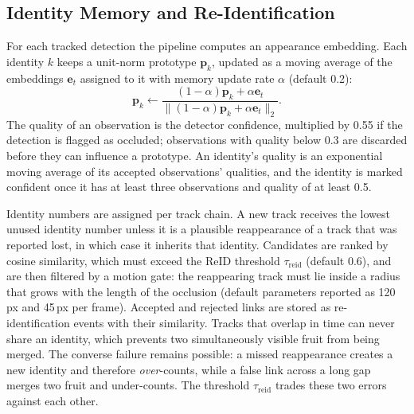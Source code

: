 \documentclass[11pt]{article}
\begin{document}
\subsection{Identity Memory and Re-Identification}

For each tracked detection the pipeline computes an appearance embedding. Each identity $k$ keeps a unit-norm prototype $\mathbf{p}_k$, updated as a moving average of the embeddings $\mathbf{e}_t$ assigned to it with memory update rate $\alpha$ (default 0.2):
\begin{equation}
\mathbf{p}_k \leftarrow \frac{(1-\alpha)\mathbf{p}_k + \alpha\mathbf{e}_t}{\|(1-\alpha)\mathbf{p}_k + \alpha\mathbf{e}_t\|_2}.
\label{eq:prototype}
\end{equation}
The quality of an observation is the detector confidence, multiplied by 0.55 if the detection is flagged as occluded; observations with quality below 0.3 are discarded before they can influence a prototype. An identity's quality is an exponential moving average of its accepted observations' qualities, and the identity is marked confident once it has at least three observations and quality of at least 0.5.

Identity numbers are assigned per track chain. A new track receives the lowest unused identity number unless it is a plausible reappearance of a track that was reported lost, in which case it inherits that identity. Candidates are ranked by cosine similarity, which must exceed the ReID threshold $\tau_{\mathrm{reid}}$ (default 0.6), and are then filtered by a motion gate: the reappearing track must lie inside a radius that grows with the length of the occlusion (default parameters reported as 120\,px and 45\,px per frame). Accepted and rejected links are stored as re-identification events with their similarity. Tracks that overlap in time can never share an identity, which prevents two simultaneously visible fruit from being merged. The converse failure remains possible: a missed reappearance creates a new identity and therefore \emph{over}-counts, while a false link across a long gap merges two fruit and under-counts. The threshold $\tau_{\mathrm{reid}}$ trades these two errors against each other.
\end{document}

